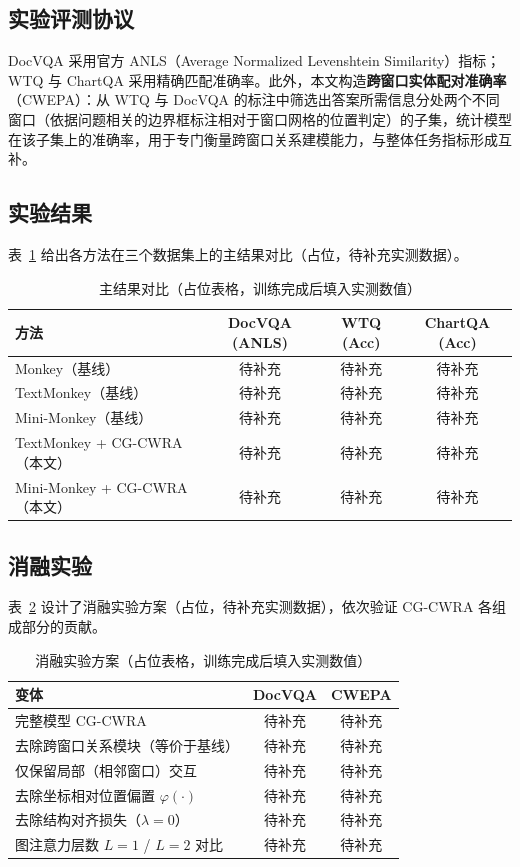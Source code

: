 \documentclass[journal]{IEEEtran}
\begin{document}
\subsection{实验评测协议}
\label{sec:protocol}
DocVQA 采用官方 ANLS（Average Normalized Levenshtein Similarity）指标；WTQ 与 ChartQA 采用精确匹配准确率。此外，本文构造\textbf{跨窗口实体配对准确率}（CWEPA）：从 WTQ 与 DocVQA 的标注中筛选出答案所需信息分处两个不同窗口（依据问题相关的边界框标注相对于窗口网格的位置判定）的子集，统计模型在该子集上的准确率，用于专门衡量跨窗口关系建模能力，与整体任务指标形成互补。

\subsection{实验结果}
表~\ref{tab:main} 给出各方法在三个数据集上的主结果对比（占位，待补充实测数据）。

\begin{table}[!t]
\renewcommand{\arraystretch}{1.2}
\caption{主结果对比（占位表格，训练完成后填入实测数值）}
\label{tab:main}
\centering
\small
\begin{tabular}{lccc}
\toprule
方法 & DocVQA (ANLS) & WTQ (Acc) & ChartQA (Acc) \\
\midrule
Monkey（基线） & 待补充 & 待补充 & 待补充 \\
TextMonkey（基线） & 待补充 & 待补充 & 待补充 \\
Mini-Monkey（基线） & 待补充 & 待补充 & 待补充 \\
TextMonkey + CG-CWRA（本文） & 待补充 & 待补充 & 待补充 \\
Mini-Monkey + CG-CWRA（本文） & 待补充 & 待补充 & 待补充 \\
\bottomrule
\end{tabular}
\end{table}

\subsection{消融实验}
表~\ref{tab:ablation} 设计了消融实验方案（占位，待补充实测数据），依次验证 CG-CWRA 各组成部分的贡献。

\begin{table}[!t]
\renewcommand{\arraystretch}{1.2}
\caption{消融实验方案（占位表格，训练完成后填入实测数值）}
\label{tab:ablation}
\centering
\footnotesize
\begin{tabular}{p{4.6cm}cc}
\toprule
变体 & DocVQA & CWEPA \\
\midrule
完整模型 CG-CWRA & 待补充 & 待补充 \\
去除跨窗口关系模块（等价于基线） & 待补充 & 待补充 \\
仅保留局部（相邻窗口）交互 & 待补充 & 待补充 \\
去除坐标相对位置偏置 $\varphi(\cdot)$ & 待补充 & 待补充 \\
去除结构对齐损失（$\lambda=0$） & 待补充 & 待补充 \\
图注意力层数 $L=1$ / $L=2$ 对比 & 待补充 & 待补充 \\
\bottomrule
\end{tabular}
\end{table}
\end{document}
